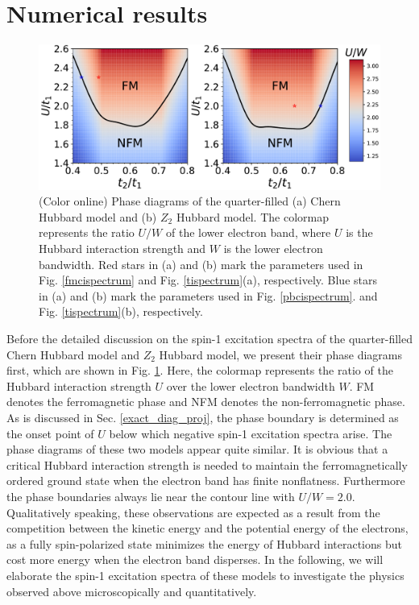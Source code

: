 \documentclass[amsmath,superscriptaddress,showpacs,aps,prb,twocolumn]{revtex4-1}
\begin{document}
\section{Numerical results}\label{nr}
\begin{figure}
\includegraphics[width=\columnwidth]{phase}
\caption{(Color online) Phase diagrams of the quarter-filled (a) Chern Hubbard model and (b) $Z_2$ Hubbard model. The colormap represents the ratio $U/W$ of the lower electron band, where $U$ is the Hubbard interaction strength and $W$ is the lower electron bandwidth. Red stars in (a) and (b) mark the parameters used in Fig. \ref{fmcispectrum} and Fig. \ref{tispectrum}(a), respectively. Blue stars in (a) and (b) mark the parameters used in Fig. \ref{pbcispectrum}. and Fig. \ref{tispectrum}(b), respectively.}
\label{phase}
\end{figure}

\par Before the detailed discussion on the spin-1 excitation spectra of the quarter-filled Chern Hubbard model and $Z_2$ Hubbard model, we present their phase diagrams first, which are shown in Fig. \ref{phase}. Here, the colormap represents the ratio of the Hubbard interaction strength $U$ over the lower electron bandwidth $W$. FM denotes the ferromagnetic phase and NFM denotes the non-ferromagnetic phase. As is discussed in Sec. \ref{exact_diag_proj}, the phase boundary is determined as the onset point of $U$ below which negative spin-1 excitation spectra arise. The phase diagrams of these two models appear quite similar. It is obvious that a critical Hubbard interaction strength is needed to maintain the ferromagnetically ordered ground state when the electron band has finite nonflatness. Furthermore the phase boundaries always lie near the contour line with $U/W=2.0$. Qualitatively speaking, these observations are expected as a result from the competition between the kinetic energy and the potential energy of the electrons, as a fully spin-polarized state minimizes the energy of Hubbard interactions but cost more energy when the electron band disperses. In the following, we will elaborate the spin-1 excitation spectra of these models to investigate the physics observed above microscopically and quantitatively.
\end{document}
